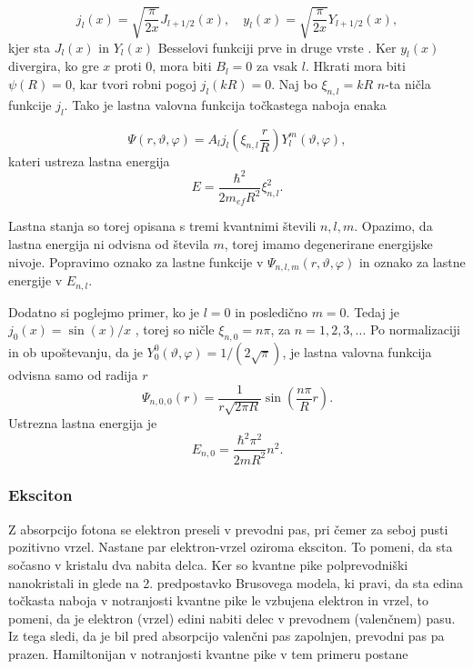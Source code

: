 \documentclass[twoside,11pt]{article}
\begin{document}
\begin{equation}
   j_l(x) = \sqrt{\frac{\pi}{2x}}J_{l+1/2}(x), \quad y_l(x) = \sqrt{\frac{\pi}{2x}}Y_{l+1/2}(x),
\end{equation}
kjer sta $J_l(x)$ in $Y_l(x)$ Besselovi funkciji prve in druge vrste \cite{abramowitz1965handbook}. Ker $y_l(x)$ divergira, ko gre $x$ proti $0$, mora biti $B_l = 0$ za vsak $l$.
Hkrati mora biti $\psi(R) = 0$, kar tvori robni pogoj $j_l(kR) = 0$. Naj bo $\xi_{n,l} = kR$ $n$-ta ničla funkcije $j_l$. Tako je lastna valovna funkcija točkastega naboja enaka

\begin{equation}
   \varPsi(r, \vartheta, \varphi) = A_l j_l\left(\xi_{n,l} \frac{r}{R}\right) Y_l^m(\vartheta, \varphi),
\end{equation}
kateri ustreza lastna energija
\begin{equation}
   E = \frac{\hbar^2}{2m_{ef}R^2}\xi_{n,l}^2.
\end{equation}

Lastna stanja so torej opisana s tremi kvantnimi števili $n,l,m$. Opazimo, da lastna energija ni odvisna od števila $m$, torej imamo degenerirane energijske nivoje. Popravimo oznako za lastne funkcije
v $\varPsi_{n,l,m}(r, \vartheta, \varphi)$ in oznako za lastne energije v $E_{n,l}$.

Dodatno si poglejmo primer, ko je $l = 0$ in posledično $m=0$. Tedaj je $j_0(x)=\sin(x) / x$ \cite{abramowitz1965handbook}, torej so ničle $\xi_{n,0} = n\pi$, za $n = 1,2,3,...$
Po normalizaciji in ob upoštevanju, da je $Y_0^0(\vartheta, \varphi) = 1/(2\sqrt{\pi})$, je lastna valovna funkcija odvisna samo od radija $r$
\begin{equation}
   \label{eq:valovna_en_delec}
   \varPsi_{n,0,0}(r) = \frac{1}{r\sqrt{2\pi R}} \sin \left(\frac{n\pi}{R} r\right). 
\end{equation}
Ustrezna lastna energija je
\begin{equation}
   \label{eq:energija_en_delec}
   E_{n,0} = \frac{\hbar^2 \pi^2}{2mR^2}n^2.
\end{equation}

\subsubsection{Eksciton}
\label{sec:eksciton}
Z absorpcijo fotona se elektron preseli v prevodni pas, pri čemer za seboj pusti pozitivno vrzel. Nastane par elektron-vrzel oziroma eksciton. To pomeni, da 
sta sočasno v kristalu dva nabita delca. Ker so kvantne pike polprevodniški nanokristali in glede na 2. predpostavko Brusovega modela, ki pravi, da sta edina točkasta naboja v notranjosti kvantne pike le vzbujena elektron in vrzel,
to pomeni, da je elektron (vrzel) edini nabiti delec v prevodnem (valenčnem) pasu. Iz tega sledi, da je bil pred absorpcijo valenčni pas zapolnjen, prevodni pas pa prazen.
Hamiltonijan v notranjosti kvantne pike v tem primeru postane
\end{document}
